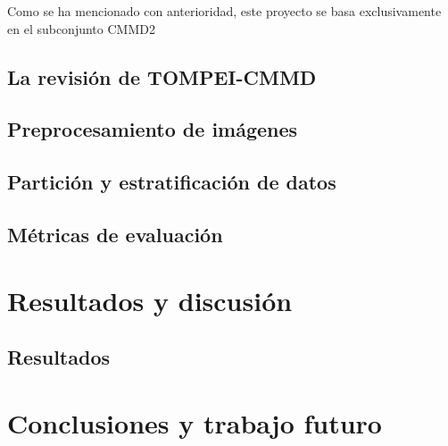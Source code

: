 \documentclass[a4paper,10pt]{book}
\begin{document}
Como se ha mencionado con anterioridad, este proyecto se basa exclusivamente en el subconjunto CMMD2
\section{La revisión de TOMPEI-CMMD}
\section{Preprocesamiento de imágenes}
\section{Partición y estratificación de datos}
\section{Métricas de evaluación}


\chapter{Resultados y discusión}
\section{Resultados}

\chapter{Conclusiones y trabajo futuro}

\backmatter
{}


\end{document}
